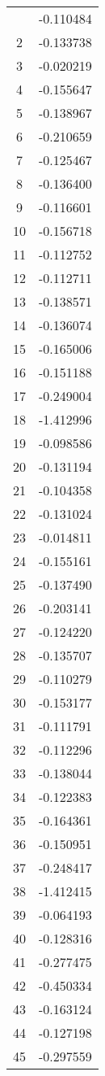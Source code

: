 \documentclass[12pt]{article}
\begin{document}
\begin{longtable}{@{}cc@{}}
\bottomrule
\endlastfoot
1 & -0.110484 \\
2 & -0.133738 \\
3 & -0.020219 \\
4 & -0.155647 \\
5 & -0.138967 \\
6 & -0.210659 \\
7 & -0.125467 \\
8 & -0.136400 \\
9 & -0.116601 \\
10 & -0.156718 \\
11 & -0.112752 \\
12 & -0.112711 \\
13 & -0.138571 \\
14 & -0.136074 \\
15 & -0.165006 \\
16 & -0.151188 \\
17 & -0.249004 \\
18 & -1.412996 \\
19 & -0.098586 \\
20 & -0.131194 \\
21 & -0.104358 \\
22 & -0.131024 \\
23 & -0.014811 \\
24 & -0.155161 \\
25 & -0.137490 \\
26 & -0.203141 \\
27 & -0.124220 \\
28 & -0.135707 \\
29 & -0.110279 \\
30 & -0.153177 \\
31 & -0.111791 \\
32 & -0.112296 \\
33 & -0.138044 \\
34 & -0.122383 \\
35 & -0.164361 \\
36 & -0.150951 \\
37 & -0.248417 \\
38 & -1.412415 \\
39 & -0.064193 \\
40 & -0.128316 \\
41 & -0.277475 \\
42 & -0.450334 \\
43 & -0.163124 \\
44 & -0.127198 \\
45 & -0.297559 \\

\end{longtable}
\end{document}
